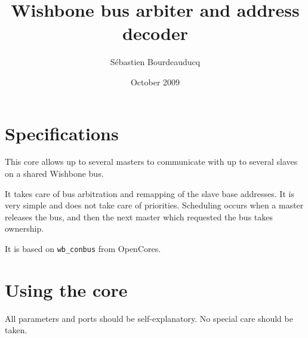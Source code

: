 \documentclass[a4paper,11pt]{article}
\title{Wishbone bus arbiter and address decoder}
\author{S\'ebastien Bourdeauducq}
\date{October 2009}
\begin{document}
\setlength{\parindent}{0pt}
\setlength{\parskip}{5pt}
\maketitle{}
\section{Specifications}
This core allows up to several masters to communicate with up to several slaves on a shared Wishbone bus.

It takes care of bus arbitration and remapping of the slave base addresses. It is very simple and does not take care of priorities. Scheduling occurs when a master releases the bus, and then the next master which requested the bus takes ownership.

It is based on \verb!wb_conbus! from OpenCores.

\section{Using the core}
All parameters and ports should be self-explanatory. No special care should be taken.
\end{document}
